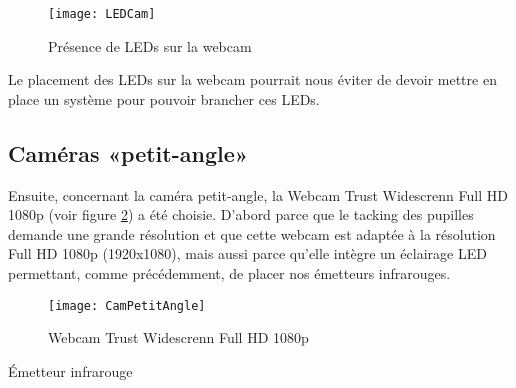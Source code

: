 \begin{figure}[H]
  \centering
  \texttt{[image: LEDCam]}
  \caption{Présence de LEDs sur la webcam}
  \label{fig:LEDCam}
\end{figure}

Le placement des LEDs sur la webcam pourrait nous éviter de devoir mettre en place un système pour pouvoir brancher ces LEDs.


\subsection{Caméras «petit-angle»}

Ensuite, concernant la caméra petit-angle, la Webcam Trust Widescrenn Full HD 1080p (voir figure \ref{fig:CamPetitAngle}) a été choisie. D'abord parce que le tacking des pupilles demande une grande résolution et que cette webcam est adaptée à la résolution Full HD 1080p (1920x1080), mais aussi parce qu'elle intègre un éclairage LED permettant, comme précédemment, de placer nos émetteurs infrarouges.

\begin{figure}[H]
  \centering
  \texttt{[image: CamPetitAngle]}
  \caption{Webcam Trust Widescrenn Full HD 1080p}
  \label{fig:CamPetitAngle}
\end{figure}Émetteur infrarouge





